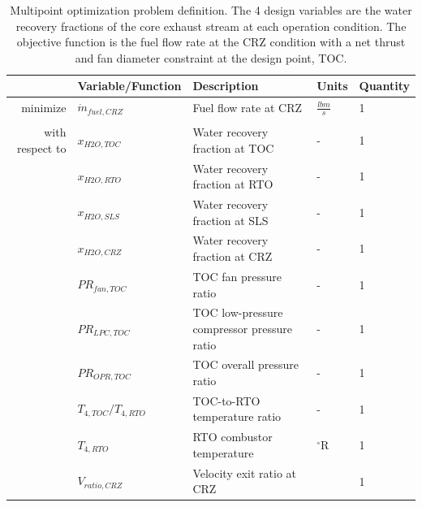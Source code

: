 \documentclass[conf]{new-aiaa}
\begin{document}
\begin{table}[h]
  \centering
  \caption{
    Multipoint optimization problem definition.
    The 4 design variables are the water recovery fractions of the core exhaust stream at each operation condition.
    The objective function is the fuel flow rate at the CRZ condition with a net thrust and fan diameter constraint at the design point, TOC.
  }
  \small
  \renewcommand{\arraystretch}{1.2}
  \begin{tabular}{r l l l l}
    \toprule
                    & Variable/Function           & Description                                & Units           & Quantity \\
    \hline
    minimize        & $ \dot{m}_{fuel,CRZ} $      & Fuel flow rate at CRZ                      & $\frac{lbm}{s}$ & 1        \\
                    &                             &                                            &                 &          \\
    with respect to & $x_{H2O,TOC}$               & Water recovery fraction at TOC             & -               & 1        \\
                    & $x_{H2O,RTO}$               & Water recovery fraction at RTO             & -               & 1        \\
                    & $x_{H2O,SLS}$               & Water recovery fraction at SLS             & -               & 1        \\
                    & $x_{H2O,CRZ}$               & Water recovery fraction at CRZ             & -               & 1        \\
                    & $PR_{fan,TOC}$              & TOC fan pressure ratio                     & -               & 1        \\
                    & $PR_{LPC,TOC}$              & TOC low-pressure compressor pressure ratio & -               & 1        \\
                    & $PR_{OPR,TOC}$              & TOC overall pressure ratio                 & -               & 1        \\
                    & $T_{4,TOC}/T_{4,RTO}$       & TOC-to-RTO temperature ratio               & -               & 1        \\
                    & $T_{4,RTO}$                 & RTO combustor temperature                  & $^\circ$R       & 1        \\
                    & $V_{ratio,CRZ}$             & Velocity exit ratio at CRZ                 &                 & 1        \\

\end{tabular}
\end{table}
\end{document}
